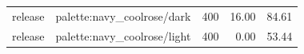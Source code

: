 \begin{longtable}{l>{\raggedright\arraybackslash}p{.42\linewidth}rrr}
release & %
palette:navy\_\allowbreak{}coolrose/dark & %
400 & %
16.00 & %
84.61 \\ %

release & %
palette:navy\_\allowbreak{}coolrose/light & %
400 & %
0.00 & %
53.44 \\ %


\end{longtable}
